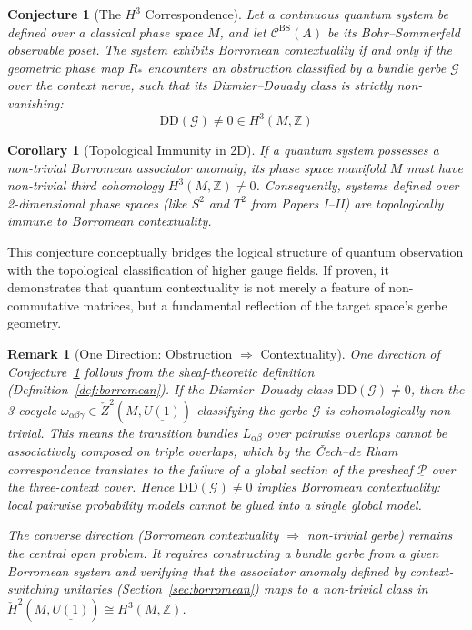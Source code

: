\documentclass[11pt]{article}
\newtheorem{remark}[theorem]{Remark}
\newtheorem{conjecture}[theorem]{Conjecture}
\newtheorem{corollary}[theorem]{Corollary}
\begin{document}
\begin{conjecture}[The $H^3$ Correspondence]
\label{conj:h3}
Let a continuous quantum system be defined over a classical phase space $M$, and let $\mathcal{C}^{\mathrm{BS}}(A)$ be its Bohr--Sommerfeld observable poset. The system exhibits Borromean contextuality if and only if the geometric phase map $R_*$ encounters an obstruction classified by a bundle gerbe $\mathcal{G}$ over the context nerve, such that its Dixmier--Douady class is strictly non-vanishing:
\[
    \mathrm{DD}(\mathcal{G}) \neq 0 \in H^3(M, \mathbb{Z})
\]
\end{conjecture}

\begin{corollary}[Topological Immunity in 2D]
\label{cor:2d-immune}
If a quantum system possesses a non-trivial Borromean associator anomaly, its phase space manifold $M$ must have non-trivial third cohomology $H^3(M, \mathbb{Z}) \neq 0$. Consequently, systems defined over 2-dimensional phase spaces (like $S^2$ and $T^2$ from Papers I--II) are topologically immune to Borromean contextuality.
\end{corollary}

This conjecture conceptually bridges the logical structure of quantum observation with the topological classification of higher gauge fields. If proven, it demonstrates that quantum contextuality is not merely a feature of non-commutative matrices, but a fundamental reflection of the target space's gerbe geometry.

\begin{remark}[One Direction: Obstruction $\Rightarrow$ Contextuality]
\label{rem:partial-evidence}
One direction of Conjecture~\ref{conj:h3} follows from the sheaf-theoretic definition (Definition~\ref{def:borromean}). If the Dixmier--Douady class $\mathrm{DD}(\mathcal{G}) \neq 0$, then the 3-cocycle $\omega_{\alpha\beta\gamma} \in \check{Z}^2(M, \underline{U(1)})$ classifying the gerbe $\mathcal{G}$ is cohomologically non-trivial. This means the transition bundles $L_{\alpha\beta}$ over pairwise overlaps cannot be associatively composed on triple overlaps, which by the \v{C}ech--de Rham correspondence translates to the failure of a global section of the presheaf $\underline{\mathcal{P}}$ over the three-context cover. Hence $\mathrm{DD}(\mathcal{G}) \neq 0$ implies Borromean contextuality: local pairwise probability models cannot be glued into a single global model.

The converse direction (Borromean contextuality $\Rightarrow$ non-trivial gerbe) remains the central open problem. It requires constructing a bundle gerbe from a given Borromean system and verifying that the associator anomaly defined by context-switching unitaries (Section~\ref{sec:borromean}) maps to a non-trivial class in $\check{H}^2(M, \underline{U(1)}) \cong H^3(M, \mathbb{Z})$.
\end{remark}
\end{document}
